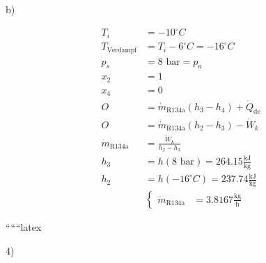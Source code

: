 b)

\begin{align*}
T_i &= -10^\circ C \\
T_{\text{Verdampf}} &= T_i - 6^\circ C = -16^\circ C \\
p_s &= 8 \text{ bar} = p_a \\
x_2 &= 1 \\
x_4 &= 0 \\
O &= \dot{m}_{\text{R134a}} (h_3 - h_4) + \dot{Q}_{\text{de}} \\
O &= \dot{m}_{\text{R134a}} (h_2 - h_3) - \dot{W}_k \\
\dot{m}_{\text{R134a}} &= \frac{\dot{W}_k}{h_2 - h_3} \\
h_3 &= h(8 \text{ bar}) = 264.15 \frac{\text{kJ}}{\text{kg}} \\
h_2 &= h(-16^\circ C) = 237.74 \frac{\text{kJ}}{\text{kg}} \\
&\left\{
\begin{aligned}
\dot{m}_{\text{R134a}} &= 3.8167 \frac{\text{kg}}{\text{h}}
\end{aligned}
\right.
\end{align*}

``````latex


4)